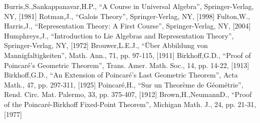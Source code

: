\documentclass[aps,twocolumn,secnumarabic,nobalancelastpage,amsmath,amssymb,
amsthm,nofootinbib,parskip=full]{revtex4}
\numberwithin{equation}{section}
\begin{document}
\begin{thebibliography}{99}
Burris,S.,Sankappanavar,H.P., ``A Course in Universal Algebra'', Springer-Verlag, NY, [1981]
Rotman,J., ``Galois Theory'', Springer-Verlag, NY, [1998]
Fulton,W., Harris,J., ``Representation Theory: A First Course'', Springer-Verlag, NY, [2004]
Humphreys,J., ``Introduction to Lie Algebras and Representation Theory'', Springer-Verlag, NY, [1972]
Brouwer,L.E.J., ``\"Uber Abbildung von Mannigfaltigkeiten'', Math. Ann., 71, pp. 97-115, [1911]
Birkhoff,G.D., ``Proof of Poincar\'e's Geometric Theorem'', Trans. Amer. Math. Soc., 14, pp. 14-22, [1913]
Birkhoff,G.D., ``An Extension of Poincar\'e's Last Geometric Theorem'', Acta Math., 47, pp. 297-311, [1925]
Poincar\'e,H., ``Sur un Theor\`eme de G\'eom\'etrie'', Rend. Circ. Mat. Palermo, 33, pp. 375-407, [1912]
Brown,H.,NeumannD., ``Proof of the Poincar\'e-Birkhoff Fixed-Point Theorem'', Michigan Math. J., 24, pp. 21-31, [1977]

\end{thebibliography}
\end{document}
